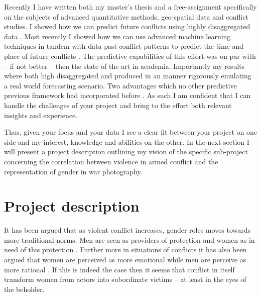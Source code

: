 \documentclass[a4paper]{article}
\begin{document}
Recently I have written both my master's thesis \citep{SPECIALE} and a free-assignment \citep{Maase} specifically on the subjects of advanced quantitative methods, geo-spatial data and conflict studies. I showed how we can predict future conflicts using highly disaggregated data \cite{Maase,SPECIALE}. Most recently I showed how we can use advanced machine learning techniques in tandem with data past conflict patterns to predict the time and place of future conflicts \cite{SPECIALE}. The predictive capabilities of this effort was on par with -- if not better -- then the state of the art in academia. Importantly my results where both high disaggregated and produced in an manner rigorously emulating a real world forecasting scenario. Two advantages which no other predictive previous framework had incorporated before \citep[48-50]{SPECIALE}. As such I am confident that I can handle the challenges of your project and bring to the effort both relevant insights and experience.\par

Thus, given your focus and your data I see a clear fit between your project on one side and my interest, knowledge and abilities on the other. In the next section I will present a project description outlining my vision of the specific sub-project concerning the correlation between violence in armed conflict and the representation of gender in war photography.\par

\section{Project description} 



It has been argued that as violent conflict increases, gender roles moves towards more traditional norms. Men are seen as providers of protection and women as in need of this protection \cite{elshtain1995women, carpenter2003women}. Further more in situations of conflicts it has also been argued that women are perceived as more emotional while men are perceive as more rational \cite{elshtain1993public}. If this is indeed the case then it seems that conflict in itself transform women from actors into subordinate victims -- at least in the eyes of the beholder.\par 
\end{document}
